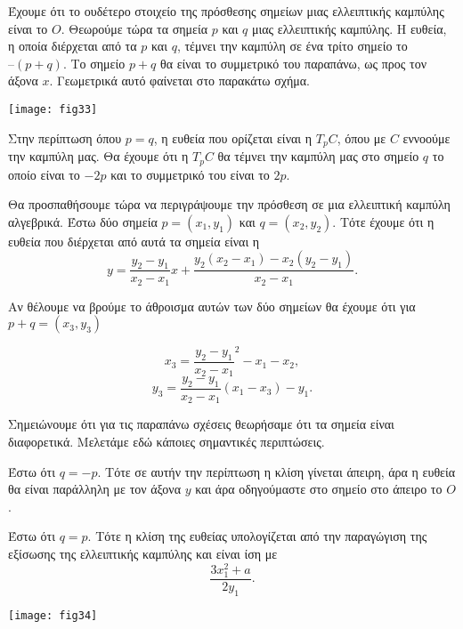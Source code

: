 \documentclass[12pt, a4paper]{book}
\begin{document}
Έχουμε ότι το ουδέτερο στοιχείο της πρόσθεσης σημείων μιας ελλειπτικής καμπύλης είναι το $O$. Θεωρούμε τώρα τα σημεία $p$ και $q$ μιας ελλειπτικής καμπύλης. Η ευθεία, η οποία διέρχεται από τα $p$ και $q$, τέμνει την καμπύλη σε ένα τρίτο σημείο το $–(p+q)$. Το σημείο $p+q$ θα είναι το συμμετρικό του παραπάνω, ως προς τον άξονα $x$. Γεωμετρικά αυτό φαίνεται στο παρακάτω σχήμα.

\begin{center}
\texttt{[image: fig33]}
\end{center}

Στην περίπτωση όπου $p=q$, η ευθεία που ορίζεται είναι η $T_pC$, όπου με $C$ εννοούμε την καμπύλη μας. Θα έχουμε ότι η $T_pC$ θα τέμνει την καμπύλη μας στο σημείο $q$ το οποίο είναι το $-2p$ και το συμμετρικό του είναι το $2p$.

Θα προσπαθήσουμε τώρα να περιγράψουμε την πρόσθεση σε μια ελλειπτική καμπύλη αλγεβρικά. Έστω δύο σημεία $p=(x_1,y_1)$ και $q=(x_2,y_2)$. Τότε έχουμε ότι η ευθεία που διέρχεται από αυτά τα σημεία είναι η
\begin{displaymath}
y=\frac{y_2-y_1}{x_2-x_1}x+\frac{y_2(x_2-x_1)-x_2(y_2-y_1)}{x_2-x_1}.
\end{displaymath}

Αν θέλουμε να βρούμε το άθροισμα αυτών των δύο σημείων θα έχουμε ότι για $p+q=(x_3,y_3)$

\begin{displaymath}
x_3=\frac{y_2-y_1}{x_2-x_1}^2-x_1-x_2,
\end{displaymath}
\begin{displaymath}
y_3=\frac{y_2-y_1}{x_2-x_1}(x_1-x_3)-y_1.
\end{displaymath}

Σημειώνουμε ότι για τις παραπάνω σχέσεις θεωρήσαμε ότι τα σημεία είναι διαφορετικά. Μελετάμε εδώ κάποιες σημαντικές περιπτώσεις.

Έστω ότι $q=-p$. Τότε σε αυτήν την περίπτωση η κλίση γίνεται άπειρη, άρα η ευθεία θα είναι παράλληλη με τον άξονα $y$ και άρα οδηγούμαστε στο σημείο στο άπειρο το $O$.

Έστω ότι $q=p$. Τότε η κλίση της ευθείας υπολογίζεται από την παραγώγιση της εξίσωσης της ελλειπτικής καμπύλης και είναι ίση με
\begin{displaymath}
\frac{3x_1^2+a}{2y_1}.
\end{displaymath}

\begin{center}
\texttt{[image: fig34]}
\end{center}
\end{document}
